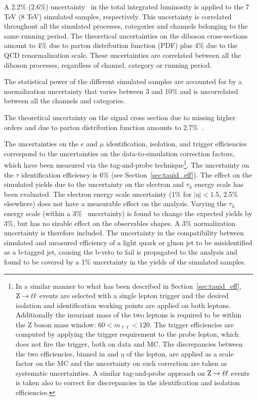 A 2.2\% (2.6\%) uncertainty~\cite{lumi-uncertainty} in the total integrated luminosity is applied to the 7 TeV (8 TeV) simulated samples, respectively. This uncertainty is correlated throughout all the simulated processes, categories and channels belonging to the same running period.
The theoretical uncertainties on %
the diboson cross-sections amount to 4\% due to parton distribution function (PDF) plus 4\% due to the QCD renormalization scale. These uncertainties are correlated between all the diboson processes, regardless of channel, category or running period.

The statistical power of the different simulated samples are accounted for by a normalization uncertainty that varies between 3 and 10\% and is uncorrelated between all the channels and categories.

The theoretical uncertainty on the signal cross section due to missing higher orders %
and due to parton distribution function amounts to 2.7\%~\cite{LHCHiggsCrossSectionWorkingGroup:2011ti}.

The uncertainties on the $e$ and $\mu$ identification, isolation, and trigger efficiencies correspond to the uncertainties on the data-to-simulation correction factors, which have been measured via the tag-and-probe technique\footnote{In a similar manner to what has been described in Section~\ref{sec:tauid_eff}, $\mathrm{Z} \rightarrow \ell \ell$ events are selected with a single lepton trigger and the desired isolation and identification working points are applied on both leptons. Additionally the invariant mass of the two leptons is required to be within the Z boson mass window: $60 < m_{\ell\ell} < 120$. The trigger efficiencies are computed by applying the trigger requirement to the probe lepton, which does not fire the trigger, both on data and MC. The discrepancies between the two efficiencies, binned in \pT and $\eta$ of the lepton, are applied as a scale factor on the MC and the uncertainty on such correction are taken as systematic uncertainties. A similar tag-and-probe approach on $\mathrm{Z} \rightarrow \ell \ell$ events is taken also to correct for discrepancies in the identification and isolation efficiencies.}.
The uncertainty on the $\tau$ identification efficiency is 6\% (see Section~\ref{sec:tauid_eff}).
The effect on the simulated yields due to the uncertainty on the electron and $\tau_h$ energy scale has been evaluated.
The electron energy scale uncertainty (1\% for $|\eta| < 1.5$, 2.5\% elsewhere) does not have a measurable effect on the analysis.
Varying the $\tau_h$ energy scale (within a 3\%~\cite{H_tautau} uncertainty) is found to change the expected yields by $3\%$, but has no sizable effect on the observables shapes. A 3\% normalization uncertainty is therefore included.
The uncertainty in the compatibility between simulated and measured efficiency of a light quark or gluon jet to be misidentified as a b-tagged jet, causing the b-veto to 
fail is propagated to the analysis and found to be covered by a 1\% uncertainty in the yields of the simulated samples.

